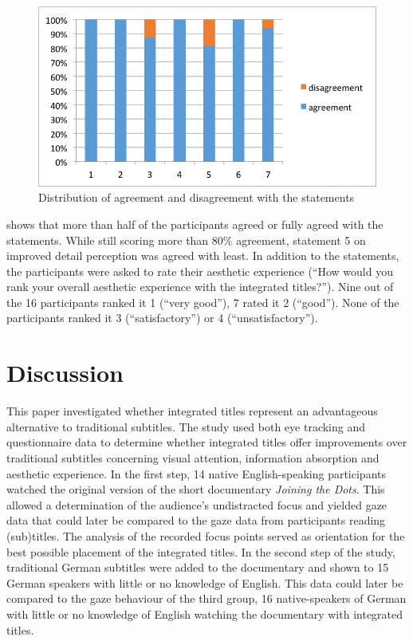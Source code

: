 \documentclass[output=paper]{langsci/langscibook}
\begin{document}
\begin{figure}
 \includegraphics[width=\textwidth]{figures/Fox11.png}
 \caption{Distribution of agreement and disagreement with the statements}
 \label{fox:fig:11}
\end{figure} 


 shows that more than half of the participants agreed or fully agreed with the statements. While still scoring more than 80\% agreement, statement 5 on improved detail perception was agreed with least. In addition to the statements, the participants were asked to rate their aesthetic experience (``How would you rank your overall aesthetic experience with the integrated titles?''). Nine out of the 16 participants ranked it 1 (``very good''), 7 rated it 2 (``good''). None of the participants ranked it 3 (``satisfactory'') or 4 (``unsatisfactory'').


\section{Discussion}

This paper investigated whether integrated titles represent an advantageous alternative to traditional subtitles. The study used both eye tracking and questionnaire data to determine whether integrated titles offer improvements over traditional subtitles concerning visual attention, information absorption and aesthetic experience. In the first step, 14 native English-speaking participants watched the original version of the short documentary \textit{Joining the Dots}. This allowed a determination of the audience's undistracted focus and yielded gaze data that could later be compared to the gaze data from participants reading (sub)titles. The analysis of the recorded focus points served as orientation for the best possible placement of the integrated titles. In the second step of the study, traditional German subtitles were added to the documentary and shown to 15 German speakers with little or no knowledge of English. This data could later be compared to the gaze behaviour of the third group, 16 native-speakers of German with little or no knowledge of English watching the documentary with integrated titles.
\end{document}
